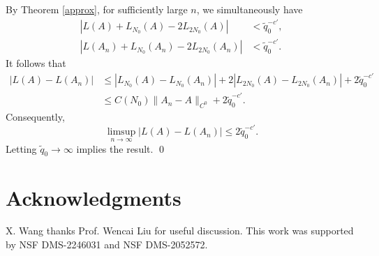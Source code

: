 \documentclass[reqno,12pt]{amsart}
\theoremstyle{plain}
\theoremstyle{definition}
\numberwithin{equation}{section}
\begin{document}
By Theorem \ref{approx}, for sufficiently large $n$, we simultaneously have
\begin{equation*}
    \begin{split}
        |L(A)+L_{N_{0}}(A)-2L_{2N_{0}}(A)|&<\tilde{q}_{0}^{-c'},\\
        |L(A_{n})+L_{N_{0}}(A_{n})-2L_{2N_{0}}(A_{n})|&<\tilde{q}_{0}^{-c'}.
    \end{split}
\end{equation*}
It follows that
\begin{equation*}
    \begin{split}
        |L(A)-L(A_{n})|&\leqslant |L_{N_{0}}(A)-L_{N_{0}}(A_{n})| +2|L_{2N_{0}}(A)-L_{2N_{0}}(A_{n})|+2\tilde{q}_{0}^{-c'}\\
        &\leqslant C(N_{0}) \|A_{n}-A\|_{C^{0}}+2\tilde{q}_{0}^{-c'}.
    \end{split}
\end{equation*}
Consequently, 
\begin{equation*}
    \limsup_{n\to\infty}|L(A)-L(A_{n})| \leqslant 2\tilde{q}_{0}^{-c'}.
\end{equation*}
Letting $\tilde{q}_{0}\to\infty$ implies the result.
\qed





\section*{Acknowledgments}
X. Wang thanks Prof. Wencai Liu for useful discussion. This work was supported by NSF DMS-2246031
and NSF DMS-2052572.



 



\end{document}
